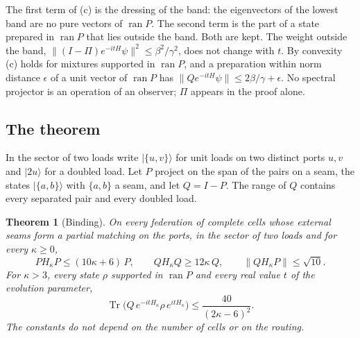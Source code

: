\documentclass[11pt]{article}
\newtheorem{theorem}{Theorem}[section]
\theoremstyle{definition}
\theoremstyle{remark}
\theoremstyle{plain}
\newcommand{\ket}[1]{\lvert #1\rangle}
\newcommand{\Tr}{\operatorname{Tr}}
\newcommand{\ran}{\operatorname{ran}}
\begin{document}
The first term of (c) is the dressing of the band: the eigenvectors of the
lowest band are no pure vectors of $\ran P$. The second term is the part of
a state prepared in $\ran P$ that lies outside the band. Both are kept. The
weight outside the band, $\lVert(I-\Pi)e^{-itH}\psi\rVert^2\le\beta^2/\gamma^2$,
does not change with $t$. By convexity (c) holds for mixtures supported in
$\ran P$, and a preparation within norm distance $\epsilon$ of a unit
vector of $\ran P$ has
$\lVert Qe^{-itH}\psi\rVert\le2\beta/\gamma+\epsilon$. No spectral projector
is an operation of an observer; $\Pi$ appears in the proof alone.

\subsection{The theorem}

In the sector of two loads write $\ket{\{u,v\}}$ for unit loads on two
distinct ports $u,v$ and $\ket{2u}$ for a doubled load. Let $P$ project on
the span of the pairs on a seam, the states $\ket{\{a,b\}}$ with $\{a,b\}$ a
seam, and let $Q=I-P$. The range of $Q$ contains every separated pair and
every doubled load.

\begin{theorem}[Binding]
\label{thm:binding}
On every federation of complete cells whose external seams form a partial
matching on the ports, in the sector of two loads and for every
$\kappa\ge0$,
\begin{equation}
PH_\kappa P\le(10\kappa+6)\,P,\qquad
QH_\kappa Q\ge12\kappa\,Q,\qquad
\lVert QH_\kappa P\rVert\le\sqrt{10}.
\label{eq:blocks}
\end{equation}
For $\kappa>3$, every state $\rho$ supported in $\ran P$ and every real
value $t$ of the evolution parameter,
\begin{equation}
\Tr\bigl(Q\,e^{-itH_\kappa}\rho\,e^{itH_\kappa}\bigr)\le\frac{40}{(2\kappa-6)^{2}} .
\label{eq:binding}
\end{equation}
The constants do not depend on the number of cells or on the routing.
\end{theorem}
\end{document}
